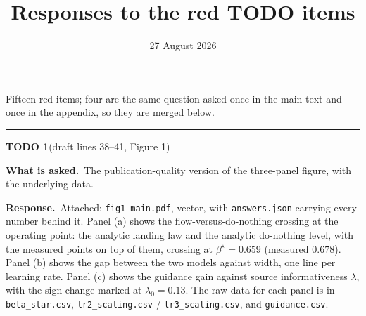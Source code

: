 \documentclass[11pt]{article}
\title{Responses to the red TODO items}
\author{}
\date{27 August 2026}
\newenvironment{todoitem}[2]{%
  \par\medskip\noindent\rule{\textwidth}{0.7pt}\par\nobreak\smallskip
  \noindent\textbf{\large TODO #1}\quad\textnormal{\small(draft #2)}\par\nobreak\smallskip
}{\par\medskip}
\newcommand{\ask}[1]{\noindent\textbf{What is asked.}\ #1\par\smallskip}
\newcommand{\resp}[1]{\noindent\textbf{Response.}\ #1\par}
\begin{document}
\maketitle

Fifteen red items; four are the same question asked once in the main text and once in the
appendix, so they are merged below.

\begin{todoitem}{1}{lines 38--41, Figure 1}
\ask{The publication-quality version of the three-panel figure, with the underlying data.}

\resp{Attached: \texttt{fig1\_main.pdf}, vector, with \texttt{answers.json} carrying every number
behind it. Panel (a) shows the flow-versus-do-nothing crossing at the operating point: the
analytic landing law and the analytic do-nothing level, with the measured points on top of them,
crossing at $\beta^\star=0.659$ (measured $0.678$). Panel (b) shows the gap between the two
models against width, one line per learning rate. Panel (c) shows the guidance gain against
source informativeness $\lambda$, with the sign change marked at $\lambda_0=0.13$. The raw data
for each panel is in \texttt{beta\_star.csv}, \texttt{lr2\_scaling.csv} /
\texttt{lr3\_scaling.csv}, and \texttt{guidance.csv}.}
\end{todoitem}
\end{document}
